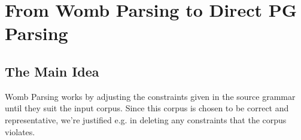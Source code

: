 \documentclass{llncs}
\newcommand{\precedence}[3]{\textit{#1} : \textit{#2} \prec \textit{#3}}
\begin{document}
%

\section{From Womb Parsing to Direct PG Parsing}

\begin{comment}
The way Womb Parsing works is by adjusting the  constraints given in the source grammar so that they suit the input corpus being parsed. Since this corpus is chosen to be correct and representative, we're justified for instance in deleting any constraints that the corpus violates.

As an example, if the source grammar contains the precedence constraint $\precedence{np}{n}{adj}$, encoded as:

\begin{verbatim}
(1) g(precedence(np, n, adj)).  
\end{verbatim}

and there is an input noun phrase in which an adjective precedes a noun, the following CHRG rule will apply and delete the above precedence constraint (via the call to "update"):

\begin{verbatim}
(2) !word(C2,Phrase_,_), ... , !word(C1,Phrase,_,_), 
    g(precedence(Phrase, C1, C2))}
    <:> {update(precedence(Phrase,C1,C2,Phrase)}
\end{verbatim}
Each word is stored in a CHRG symbol word/3, along with its category, its mother constituent,  and traits (i.e. word(n,np,[sing,masc],livre)). Since the CHRG parse predicate stores and abstracts the position of each word in the sentence, this simpagation rule is triggered when a word of category C2 comes before one of category C1, given the existence of the grammar constraint that C1 must precede C2 within a phrase of type Phrase. In CHRG syntax the symbols prefixed with exclamation points are kept, while the ones without are replaced by the body of the rule.  Each of the properties dealt with has similar rules associated with it.

\end{comment}
\subsection{The Main Idea}

Womb Parsing works  by adjusting the  constraints given in the source grammar until they suit the input corpus. Since this corpus is chosen to be correct and representative, we're justified e.g. in deleting any constraints that the corpus violates.
\end{document}
